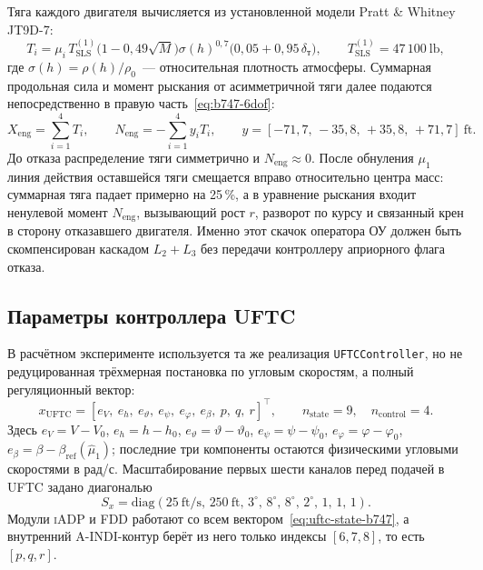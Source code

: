 \documentclass[a4paper,14pt]{extarticle}
\newcommand{\UFTC}{\textsc{UFTC}}
\newcommand{\IADP}{\textsc{iADP}}
\newcommand{\AINDI}{\textsc{A-INDI}}
\newcommand{\FDD}{\textsc{FDD}}
\newcommand{\degr}{^{\circ}}
\newcommand{\dt}{\delta_{\text{т}}}
\begin{document}
Тяга каждого двигателя вычисляется из установленной модели Pratt \& Whitney JT9D-7:
\begin{equation}
T_i = \mu_i\,T_{\text{SLS}}^{(1)}
\bigl(1-0{,}49\sqrt{M}\bigr)\sigma(h)^{0{,}7}
\bigl(0{,}05+0{,}95\,\dt\bigr),
\qquad T_{\text{SLS}}^{(1)}=47\,100~\text{lb},
\label{eq:b747-engine-thrust}
\end{equation}
где $\sigma(h)=\rho(h)/\rho_0$~--- относительная плотность атмосферы. Суммарная продольная сила и момент рыскания от асимметричной тяги далее подаются непосредственно в правую часть~\eqref{eq:b747-6dof}:
\begin{equation}
X_{\text{eng}}=\sum_{i=1}^{4}T_i,\qquad
N_{\text{eng}}=-\sum_{i=1}^{4} y_i T_i,\qquad
y=[-71{,}7,\,-35{,}8,\,+35{,}8,\,+71{,}7]~\text{ft}.
\label{eq:b747-engine-moment}
\end{equation}
До отказа распределение тяги симметрично и $N_{\text{eng}}\approx0$. После обнуления $\mu_1$ линия действия оставшейся тяги смещается вправо относительно центра масс: суммарная тяга падает примерно на 25\,\%, а в уравнение рыскания входит ненулевой момент $N_{\text{eng}}$, вызывающий рост $r$, разворот по курсу и связанный крен в сторону отказавшего двигателя. Именно этот скачок оператора ОУ должен быть скомпенсирован каскадом $L_2+L_3$ без передачи контроллеру априорного флага отказа.

\subsection{Параметры контроллера UFTC}

В расчётном эксперименте используется та же реализация \texttt{UFTCController}, но не редуцированная трёхмерная постановка по угловым скоростям, а полный регуляционный вектор:
\begin{equation}
x_{\mathrm{UFTC}} =
\left[
e_V,\ e_h,\ e_{\vartheta},\ e_{\psi},\ e_{\varphi},\ e_{\beta},\ p,\ q,\ r
\right]^\top,
\qquad n_{\text{state}}=9,\quad n_{\text{control}}=4.
\label{eq:uftc-state-b747}
\end{equation}
Здесь $e_V=V-V_0$, $e_h=h-h_0$, $e_{\vartheta}=\vartheta-\vartheta_0$, $e_{\psi}=\psi-\psi_0$, $e_{\varphi}=\varphi-\varphi_0$, $e_{\beta}=\beta-\beta_{\text{ref}}(\hat\mu_1)$; последние три компоненты остаются физическими угловыми скоростями в рад/с. Масштабирование первых шести каналов перед подачей в \UFTC{} задано диагональю
\[
S_x=\mathrm{diag}\left(25~\text{ft/s},\,250~\text{ft},\,3\degr,\,8\degr,\,8\degr,\,2\degr,\,1,\,1,\,1\right).
\]
Модули \IADP{} и \FDD{} работают со всем вектором~\eqref{eq:uftc-state-b747}, а внутренний \AINDI{}-контур берёт из него только индексы $[6,7,8]$, то есть $[p,q,r]$.
\end{document}
